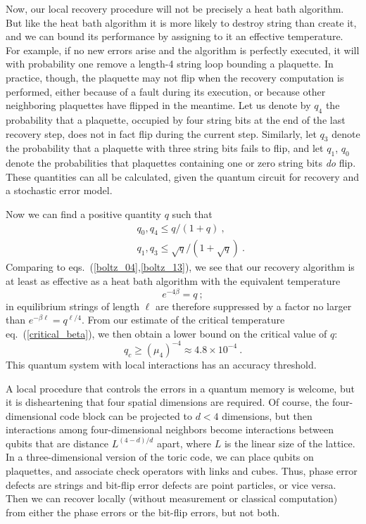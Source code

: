 Now, our local recovery procedure will not be precisely a heat bath algorithm.
But like the heat bath algorithm it is more likely to destroy string than
create it, and we can bound its performance by assigning to it an effective
temperature. For example, if no new errors arise and the algorithm is perfectly
executed, it will with probability one remove a length-4 string loop bounding a
plaquette.  In practice, though, the plaquette may not flip when the recovery
computation is performed, either because of a fault during its execution, or
because other neighboring plaquettes have flipped in the meantime.  Let us
denote by $q_4$ the probability that a plaquette, occupied by four string bits
at the end of the last recovery step, does not in fact flip during the current
step.  Similarly, let $q_3$ denote the probability that a plaquette with three string
bits fails to flip, and let $q_1$, $q_0$ denote the probabilities that plaquettes
containing one or zero string bits {\em do} flip. These quantities can all be
calculated, given the quantum circuit for recovery and a stochastic error
model.

Now we can find a positive quantity $q$ such that
\begin{eqnarray}
& & q_0, q_4\le q/(1+q)~,\nonumber\\
& & q_1, q_3\le \sqrt{q}/(1+\sqrt{q})~.
\end{eqnarray}
Comparing to eqs.~(\ref{boltz_04},\ref{boltz_13}), we see that our recovery algorithm is at least as effective as a heat bath algorithm
with the equivalent temperature
\begin{equation}
e^{-4\beta}=q~;
\end{equation}
in equilibrium strings of length $\ell$ are therefore suppressed by a factor no larger
than $e^{-\beta \ell}=q^{\ell/4}$. From our estimate of the critical temperature eq.~(\ref{critical_beta}), we
then obtain a lower bound on the  critical value of $q$:
\begin{equation}
q_c \ge (\mu_4)^{-4}\approx 4.8\times 10^{-4}~.
\end{equation}
This quantum system with local interactions has an accuracy threshold.

A local procedure that controls the errors in a quantum memory is welcome, but it is disheartening that four spatial dimensions are required. Of course, the four-dimensional code block can be projected to $d<4$ dimensions, but then interactions among four-dimensional neighbors become interactions between qubits that are distance $L^{(4-d)/d}$ apart, where $L$ is the linear size of the lattice. In a three-dimensional version of the toric code, we can place qubits on plaquettes, and associate check operators with links and cubes. Thus, phase error defects are strings and bit-flip error defects are point particles, or vice versa. Then we can recover locally (without measurement or classical computation) from either the phase errors or the bit-flip errors, but not both.

